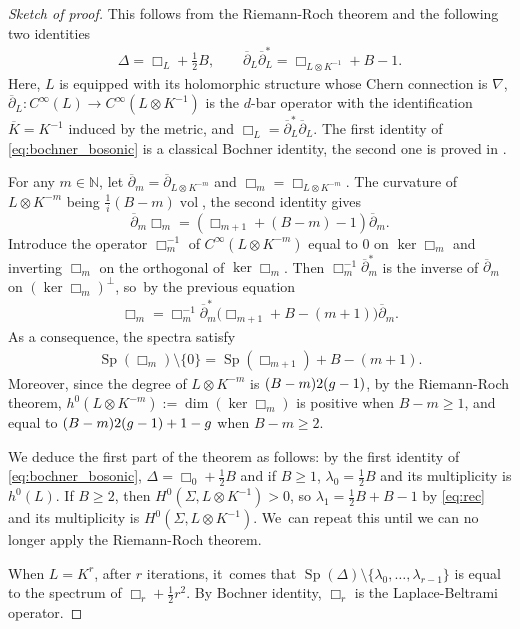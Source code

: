 \documentclass[10pt,a4paper]{amsart}
\theoremstyle{plain}
\theoremstyle{definition}
\let\con\overline
\let\op\operatorname
\newcommand{\N}{\mathbb{N}}
\let\la\lambda
\begin{document}
\begin{proof}[Sketch of proof] This follows from the Riemann-Roch theorem and the
following two identities
\begin{gather} \label{eq:bochner_bosonic}
\Delta = \Box_L + \tfrac{1}{2} B, \qquad \con{\partial}_L
\con{\partial}_L^* = \Box_{L \otimes K^{-1}} +B -1.
\end{gather}
Here, $L$ is equipped with its holomorphic structure whose Chern connection
is $\nabla$, $\con{\partial}_L: C^{\infty} (L)
\rightarrow C^{\infty} (L \otimes K^{-1})$ is the $d$-bar
operator with the identification $\con{ K} = K^{-1}$ induced by
the metric, and $\Box_L = \con{\partial}_L^*
\con{\partial}_L$. The first identity of \eqref{eq:bochner_bosonic} is a
classical Bochner identity, the second one is proved in \cite[Th.\,7.1]{Landau1}.

For any $m \in \N$, let $\con{\partial}_m = \con{\partial}_{L \otimes
K^{-m}}$ and $\Box_m = \Box_{L \otimes K^{-m}}$. The curvature of $L
\otimes K^{-m}$ being $\frac{1}{i} (B -m) \op{vol}$, the second identity
gives
\[
\con{\partial}_m \Box_m = (
\Box_{m+1} + (B - m) - 1) \con{\partial}_m.\]
Introduce the operator $\Box_{m}^{-1}$
of $C^\infty(L \otimes K^{-m})$ equal to $0$ on $\ker \Box_m$
and inverting $\Box_m$ on the orthogonal of $\ker \Box_m$. Then
$\Box_m^{-1} \con{\partial}_m^*$ is the inverse of $\con{\partial}_m$ on
$(\ker \Box_m)^{\perp}$, so~by the previous equation
\begin{gather*}
\Box_m = \Box_m^{-1} \con{\partial}_m^* \bigl(\Box_{m+1} + B - (m+1)
\bigr) \con{\partial}_m.
\end{gather*}
As a consequence, the spectra satisfy
\begin{gather} \label{eq:rec}
\op{Sp} (\Box_m) \setminus \{ 0 \} = \op{Sp} (
\Box_{m+1}) + B - (m +1).
\end{gather}
Moreover, since the degree of $L \otimes K^{-m}$ is $(B- m) 2 (\textsl{g} -1)$, by
the Riemann-Roch theorem, $h^0 (L \otimes K^{-m}) := \op{dim} (\ker \Box_m)$ is
positive when $B - m \geqslant 1$, and equal to $(B-m) 2 (\textsl{g}-1) + 1 - \textsl{g}$ when
$B- m \geqslant 2 $.

We deduce the first part of the theorem as follows: by the first identity of
\eqref{eq:bochner_bosonic}, $\Delta = \Box_0 + \frac{1}{2} B$ and if $B
\geqslant 1$, $\la_0 = \tfrac{1}{2} B$ and its multiplicity is $h^0 (
L)$. If $B\geqslant 2$, then $H^{0} (\Sigma, L \otimes K^{-1}) >0$, so
$\la_1 =\frac{1}{2}B + B -1$ by \eqref{eq:rec} and its multiplicity is $H^{0}
(\Sigma, L \otimes K^{-1})$. We~can repeat this until we can no longer apply the Riemann-Roch theorem.

When $L = K^r$, after $r$ iterations, it~comes that $\op{Sp}(\Delta) \setminus \{ \la_0, \ldots, \la_{r-1} \}$
is equal to the spectrum of $\Box_r + \frac{1}{2} r^2$. By Bochner identity,
$\Box_r$ is the Laplace-Beltrami operator.
\end{proof}
\end{document}
